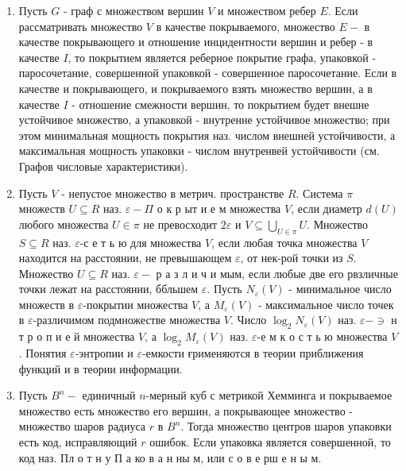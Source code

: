 \documentclass[10pt]{article}
\begin{document}
\begin{enumerate}

  \item Пусть $G$ - граф с множеством вершин $V$ и множеством ребер $E$. Если рассматривать множество $V$ в качестве покрываемого, множество $E-$ в качестве покрывающего и отношение инцидентности вершин и ребер - в качестве $I$, то покрытием является реберное покрытие графа, упаковкой - паросочетание, совершенной упаковкой - совершенное паросочетание. Если в качестве и покрывающего, и покрываемого взять множество вершин, а в качестве $I$ - отношение смежности вершин, то покрытием будет внешне устойчивое множество, а упаковкой - внутренне устойчивое множество; при этом минимальная мощность покрытия наз. числом внешней устойчивости, а максимальная мощность упаковки - числом внутренвей устойчивости (см. Графов числовые характеристики).



  \item Пусть $V$ - непустое множество в метрич. пространстве $R$. Система $\pi$ множеств $U \subseteq R$ наз. $\varepsilon-\Pi$ о к р ыт и е м множества $V$, если диаметр $d(U)$ любого множества $U \in \pi$ не превосходит $2 \varepsilon$ и $V \subseteq \bigcup_{U \in \pi} U$. Множество $S \subseteq R$ наз. $\varepsilon$-с е т ь ю для множества $V$, если любая точка множества $V$ находится на расстоянии, не превышающем $\varepsilon$, от нек-рой точки из $S$. Множество $U \subseteq R$ наз. $\varepsilon-$ р а з л и ч и мым, если любые две его рвзличные точки лежат на расстоянии, ббльшем $\varepsilon$. Пусть $N_{\varepsilon}(V)$ - минимальное число множеств в $\varepsilon$-покрытии множества $V$, а $M_{\varepsilon}(V)$ - максимальное число точек в $\varepsilon$-различимом подмножестве множества $V$. Число $\log _{2} N_{\varepsilon}(V)$ наз. $\varepsilon-\ni$ н т р о п и е й множества $V$, а $\log _{2} M_{\varepsilon}(V)$ наз. $\varepsilon$-е м к о с т ь ю множества $V$. Понятия $\varepsilon$-энтропии и $\varepsilon$-емкости ғрименяются в теории приближения функций и в теории информации.



  \item Пусть $B^{n}-$ единичный $n$-мерный куб с метрикой Хемминга и покрываемое множество есть множество его вершин, а покрывающее множество - множество шаров радиуса $r$ в $B^{n}$. Тогда множество центров шаров упаковки есть код, исправляющий $r$ ошибок. Если упаковка является совершенной, то код наз. Пл о т н у П а ко в а н ны м, или с о в е рш е н ы м.



\end{enumerate}
\end{document}
